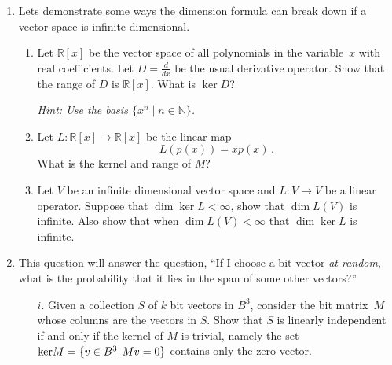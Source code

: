\begin{enumerate}

\item %
Lets demonstrate some ways the dimension formula can break down if a vector space is infinite dimensional.
\begin{enumerate}
\item Let $\mathbb{R}[x]$ be the vector space of all polynomials  in the variable~$x$ with real coefficients. Let $D = \frac{d}{dx}$ be the usual derivative operator. Show that the range of $D$ is $\mathbb{R}[x]$. What is $\ker D$?

\emph{Hint: Use the basis $\{ x^n \mid n \in \mathbb{N} \}$.}

\item Let $L \colon \mathbb{R}[x] \rightarrow \mathbb{R}[x]$ be the linear map \[L(p(x)) = xp(x)\, .\]  What is the kernel and range of $M$?



\item Let $V$ be an infinite dimensional vector space and $L \colon V \rightarrow V$ be a linear operator. Suppose that $\dim \ker L < \infty$, show that $\dim L(V)$ is infinite. Also show that when $\dim L(V) < \infty$ that $\dim \ker L$ is infinite.
\end{enumerate}

\item This question will answer the question, ``If I choose a bit vector \emph{at random}, what is the probability that it lies in the span of some other vectors?''

\begin{itemize}
\item[$i.$] Given a collection $S$ of $k$ bit vectors in $B^3$, consider the bit matrix~$M$ whose columns are the vectors in $S$.  Show that $S$ is linearly independent if and only if the kernel of $M$ is trivial, namely the set ${\rm ker}M=\{v\in B^3| \, Mv=0\}$ contains only the zero vector.


\end{itemize}
\end{enumerate}
